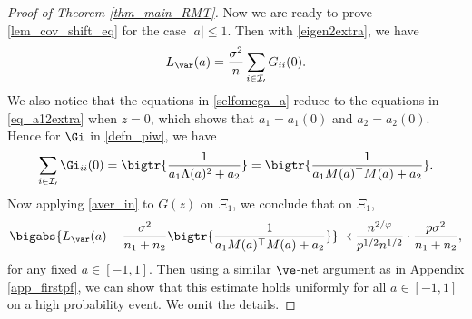 \documentclass[aos,preprint]{imsart}
\begin{document}
\begin{proof}[Proof of Theorem \ref{thm_main_RMT}]
Now we are ready to prove \eqref{lem_cov_shift_eq} for the case $|a|\le 1$. Then with \eqref{eigen2extra}, we have 
$$L_{\var}(a)=\frac{ \sigma^2 }{n}\sum_{i\in \cal I_0} G_{ii}(0).$$
We also notice that the equations in \eqref{selfomega_a} reduce to the equations in \eqref{eq_a12extra} when $z=0$, which shows that $a_1 = a_1(0)$ and $a_2 = a_2(0)$. Hence for $\Gi$ in \eqref{defn_piw}, we have
$$\sum_{i\in \cal I_0}\Gi_{ii}(0)= \bigtr{\frac1{a_1 \Lambda(a)^2 + a_2}}=\bigtr{  \frac{1}{a_1 M(a)^\top M(a) + a_2  }  }.$$
Now applying \eqref{aver_in} to $G(z)$ on $\Xi_1$, we conclude that on $\Xi_1$,
$$ \bigabs{L_{\var}(a)- \frac{\sigma^2}{n_1+n_2}\bigtr{  \frac{1}{a_1 M(a)^\top M(a) + a_2  }  }}
				\prec \frac{n^{2/\varphi}}{p^{1/2} n^{1/2}}\cdot\frac{p \sigma^2}{n_1+ n_2},  $$
for any fixed $a\in [-1,1]$. Then using a similar $\ve$-net argument as in Appendix \ref{app_firstpf}, we can show that this estimate holds uniformly for all $a\in [-1,1]$ on a high probability event. We omit the details.


\end{proof}
\end{document}

